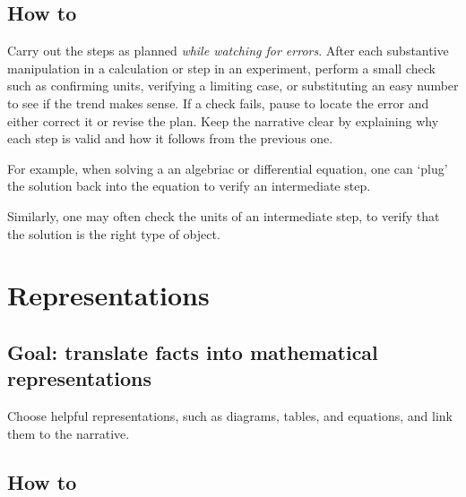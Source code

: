 \documentclass[
  a4paper,
  DIV=11,
  numbers=noendperiod,
  oneside]{scrreprt}
\begin{document}
\subsection{How to}\label{how-to-3}

Carry out the steps as planned \emph{while watching for errors}. After
each substantive manipulation in a calculation or step in an experiment,
perform a small check such as confirming units, verifying a limiting
case, or substituting an easy number to see if the trend makes sense. If
a check fails, pause to locate the error and either correct it or revise
the plan. Keep the narrative clear by explaining why each step is valid
and how it follows from the previous one.

\begin{tcolorbox}[enhanced jigsaw, colframe=quarto-callout-tip-color-frame, title=\textcolor{quarto-callout-tip-color}{\faLightbulb}\hspace{0.5em}{Example: Checking solutions}, breakable, opacityback=0, titlerule=0mm, colbacktitle=quarto-callout-tip-color!10!white, toptitle=1mm, colback=white, coltitle=black, toprule=.15mm, bottomtitle=1mm, left=2mm, arc=.35mm, rightrule=.15mm, bottomrule=.15mm, opacitybacktitle=0.6, leftrule=.75mm]

For example, when solving a an algebriac or differential equation, one
can `plug' the solution back into the equation to verify an intermediate
step.

Similarly, one may often check the units of an intermediate step, to
verify that the solution is the right type of object.

\end{tcolorbox}

\section{Representations}\label{representations}

\subsection{Goal: translate facts into mathematical
representations}\label{goal-translate-facts-into-mathematical-representations}

Choose helpful representations, such as diagrams, tables, and equations,
and link them to the narrative.

\subsection{How to}\label{how-to-4}
\end{document}
